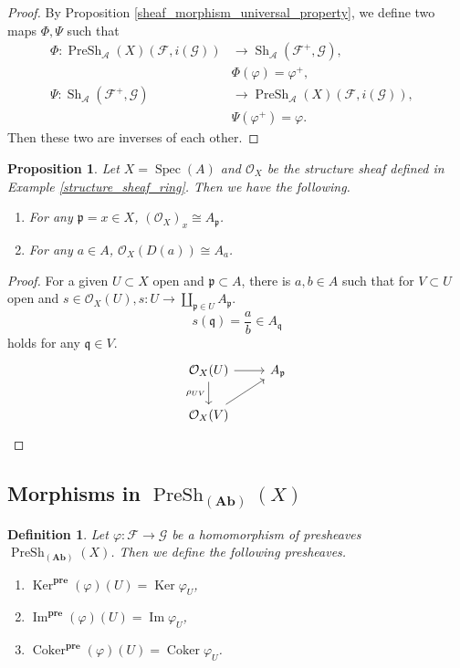 \documentclass{article}
\newtheorem{proposition}{Proposition}[section]
\newtheorem{definition}{Definition}[section]
\numberwithin{equation}{section}
\DeclareMathOperator{\Spec}{Spec}
\DeclareMathOperator{\PreSh}{PreSh}
\DeclareMathOperator{\Sh}{Sh}
\DeclareMathOperator{\Ker}{Ker}
\DeclareMathOperator{\Image}{Im}
\DeclareMathOperator{\Coker}{Coker}
\begin{document}
\begin{proof}
By Proposition \ref{sheaf_morphism_universal_property}, we define two maps $\Phi,\Psi$ such that
\begin{align*}
\Phi:\PreSh_\mathcal{A}(X)(\mathcal{F},i(\mathcal{G})) &\to \Sh_{\mathcal{A}}(\mathcal{F}^+,\mathcal{G}),&\\
& \Phi(\varphi) = \varphi^+,\\
\Psi:\Sh_{\mathcal{A}}(\mathcal{F}^+,\mathcal{G})&\to\PreSh_\mathcal{A}(X)(\mathcal{F},i(\mathcal{G})),&\\
 &\Psi(\varphi^+)  = \varphi.
\end{align*}
Then these two are inverses of each other.
\end{proof}

\begin{proposition}
Let $X=\Spec(A)$ and $\mathcal{O}_X$ be the structure sheaf defined in Example \ref{structure_sheaf_ring}. Then we have the following.
\begin{enumerate}[1).]
\item For any $\mathfrak{p}=x\in X$, $(\mathcal{O}_{X})_x \cong A_{\mathfrak{p}}$.
\item For any $a\in A$, $\mathcal{O}_X(D(a)) \cong A_a$.
\end{enumerate}
\end{proposition}

\begin{proof}
For a given $U\subset X$ open and $\mathfrak{p}\subset A$, there is $a,b\in A$ such that for $V\subset U$ open and $s\in\mathcal{O}_X(U), s:U\to\coprod_{\mathfrak{p}\in U}A_{\mathfrak{p}}$.
\begin{equation*}
s(\mathfrak{q}) = {\frac a b}\in A_{\mathfrak{q}}
\end{equation*}
holds for any $\mathfrak{q}\in V$.
\[
\begin{tikzcd}
\mathcal{O}_X(U) \arrow[r] \arrow[d, "\rho_{UV}"'] & A_\mathfrak{p} \\
\mathcal{O}_X(V) \arrow[ru]                        &               
\end{tikzcd}
\]
\end{proof}

\subsection{Morphisms in $\PreSh_{(\mathbf{Ab})}(X)$}

\begin{definition}
Let $\varphi:\mathcal{F}\to\mathcal{G}$ be a homomorphism of presheaves $\PreSh_{(\mathbf{Ab})}(X)$. Then we define the following presheaves.
\begin{enumerate}[1).]
\item $\Ker^{\mathbf{pre}}(\varphi)(U) = \Ker\varphi_U$,
\item $\Image^{\mathbf{pre}}(\varphi)(U) = \Image\varphi_U$,
\item $\Coker^{\mathbf{pre}}(\varphi)(U) = \Coker\varphi_U$.
\end{enumerate}
\end{definition}
\end{document}
